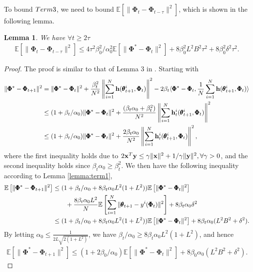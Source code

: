 \documentclass{article} %
\theoremstyle{plain}
\newtheorem{lemma}[theorem]{Lemma}
\theoremstyle{definition}
\theoremstyle{remark}
\begin{document}
{To bound $\textnormal{Term 3}$, we need to bound $\mathbb{E}[\|\pmb{\Phi}_t-\pmb{\Phi}_{t-\tau}\|^2]$, which is shown in the following lemma.
\begin{lemma}
We have $\forall t\geq 2\tau$
\begin{align}\label{eq:29}
    \mathbb{E}[\|\pmb{\Phi}_t-\pmb{\Phi}_{t-\tau}\|^2]\leq  4\tau^2\beta_0^2/\alpha_0^2\mathbb{E}[\|\pmb{\Phi}^*-\pmb{\Phi}_{t}\|^2]+8\beta_0^2L^2B^2\tau^2 +8\beta_0^2\delta^2\tau^2.
\end{align}
\end{lemma}

\begin{proof}
The proof is similar to that of Lemma 3 in \cite{dal2023federated}.
Starting with
\begin{align}\nonumber
    \|\pmb{\Phi}^*-\pmb{\Phi}_{t+1}\|^2&=\|\pmb{\Phi}^*-\pmb{\Phi}_{t}\|^2+\frac{\beta_t^2}{N^2}\left\|\sum_{i=1}^N\mathbf{h}(\pmb{\theta}_{t+1}^i, \pmb{\Phi}_t)\right\|^2-2\beta_t\langle\pmb{\Phi}^*-\pmb{\Phi}_t, \frac{1}{N}\sum_{i=1}^N\mathbf{h}(\pmb{\theta}_{t+1}^i, \pmb{\Phi}_t)\rangle\\ \nonumber
    &\leq (1+\beta_t/\alpha_0)\|\pmb{\Phi}^*-\pmb{\Phi}_{t}\|^2+\frac{(\beta_t\alpha_0+\beta_t^2)}{N^2}\left\|\sum_{i=1}^N\mathbf{h}_t^i(\pmb{\theta}_{t+1}^i, \pmb{\Phi}_t)\right\|^2\\
    &\leq (1+\beta_t/\alpha_0)\|\pmb{\Phi}^*-\pmb{\Phi}_{t}\|^2+\frac{2\beta_t\alpha_0}{N^2}\left\|\sum_{i=1}^N\mathbf{h}_t^i(\pmb{\theta}_{t+1}^i, \pmb{\Phi}_t)\right\|^2,
\end{align}
where the first inequality holds due to $2\bold{x}^T\bold{y}\leq \gamma\|\bold{x}\|^2+1/\gamma\|\bold{y}\|^2, \forall \gamma>0$, and the second inequality holds since $\beta_t\alpha_0\geq \beta_t^2$.
We then have the following inequality according to Lemma \ref{lemma:term1},
\begin{align}
   \mathbb{E}\left[ \|\pmb{\Phi}^*-\pmb{\Phi}_{t+1}\|^2\right]&\leq (1+\beta_t/\alpha_0+8\beta_t\alpha_0L^2(1+L^2))\mathbb{E}\left[ \|\pmb{\Phi}^*-\pmb{\Phi}_{t}\|^2\right]\nonumber\allowdisplaybreaks\\
   &\qquad+\frac{8\beta_t\alpha_0L^2}{N}\mathbb{E}\left[\sum_{i=1}^N\|\pmb{\theta}_{t+1}-y^i(\pmb{\Phi}_t)\|^2\right]+8\beta_t\alpha_0\delta^2\nonumber\allowdisplaybreaks\\
   &\leq (1+\beta_t/\alpha_0+8\beta_t\alpha_0L^2(1+L^2))\mathbb{E}\left[ \|\pmb{\Phi}^*-\pmb{\Phi}_{t}\|^2\right]+8\beta_t\alpha_0(L^2B^2+\delta^2).
\end{align}
By letting $\alpha_0\leq \frac{1}{2L\sqrt{2(1+L^2)}}$, we have $\beta_t/\alpha_0\geq 8\beta_t\alpha_0L^2(1+L^2) $, and hence
\begin{align}
    \mathbb{E}\left[ \|\pmb{\Phi}^*-\pmb{\Phi}_{t+1}\|^2\right]\leq (1+2\beta_0/\alpha_0)\mathbb{E}\left[ \|\pmb{\Phi}^*-\pmb{\Phi}_{t}\|^2\right]+8\beta_0\alpha_0(L^2B^2+\delta^2).
\end{align}




\end{proof}}
\end{document}
